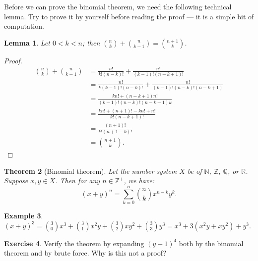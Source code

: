 \documentclass[a4paper]{amsart}
\newtheorem{thm}{Theorem}[section]
\newtheorem{lem}[thm]{Lemma}
\theoremstyle{definition}
\newtheorem{ex}[thm]{Example}
\newtheorem{exercise}[thm]{Exercise}
\theoremstyle{remark}
\begin{document}
Before we can prove the binomial theorem, we need the following technical lemma. Try to prove it
by yourself before reading the proof --- it is a simple bit of computation.
\begin{lem}
  Let $ 0 < k < n $; then $ \binom{n}{k} + \binom{n}{k - 1} = \binom{n + 1}{k} $.
\end{lem}
\begin{proof}
  \begin{align*}
    \binom{n}{k} + \binom{n}{k - 1} &= \frac{n!}{k! (n - k)!} + \frac{n!}{(k - 1)! (n - k + 1)!}\\
                                    &= \frac{n!}{k(k - 1)! (n - k)!} + \frac{n!}{(k - 1)! (n - k)! (n - k + 1)}\\
                                    &= \frac{kn! + (n - k + 1) n!}{(k - 1)! (n - k)! (n - k + 1)k}\\
                                    &= \frac{kn! + (n + 1)! - kn! + n!}{k!(n - k + 1)!}\\
                                    &= \frac{(n + 1)!}{k!(n + 1 - k)!}\\
                                    &= \binom{n + 1}{k}.
  \end{align*}
\end{proof}

\begin{thm}[Binomial theorem]
  Let the number system $ X $ be of $ \mathbb{N} $, $ \mathbb{Z} $, $ \mathbb{Q} $, or $ \mathbb{R} $. Suppose $ x, y \in X $. Then
  for any $ n \in \mathbb{Z}^+ $, we have:
  \begin{displaymath}
    (x + y)^n = \sum_{k = 0}^n \binom{n}{k} x^{n - k} y^k.
  \end{displaymath}
\end{thm}

\begin{ex}
  $ (x + y)^3 = \binom{3}{0} x^3 + \binom{3}{1} x^2 y + \binom{3}{2} x y^2 + \binom{3}{3} y^3 = x^3 + 3(x^2 y + xy^2) + y^3 $.
\end{ex}

\begin{exercise}
  Verify the theorem by expanding $ (y + 1)^4 $ both by the binomial theorem and by brute force. Why is this not a proof?
\end{exercise}
\end{document}
